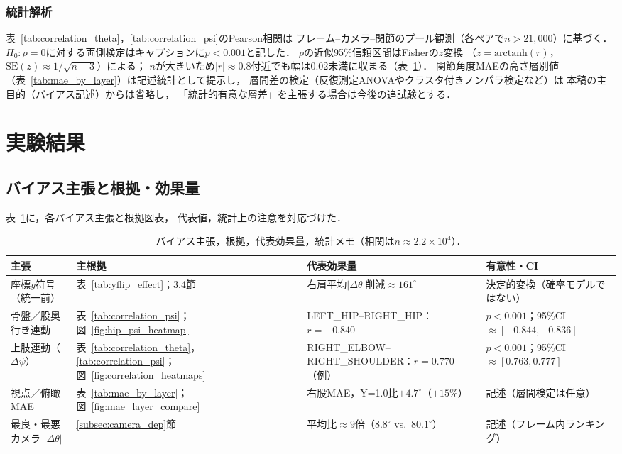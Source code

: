 \documentclass[twocolumn]{article}
\begin{document}
\subsubsection{統計解析}

表~\ref{tab:correlation_theta}，\ref{tab:correlation_psi}のPearson相関は
フレーム--カメラ--関節のプール観測（各ペアで$n>21{,}000$）に基づく．
$H_0:\rho=0$に対する両側検定はキャプションに$p<0.001$と記した．
$\rho$の近似95\%信頼区間はFisherの$z$変換
（$z=\mathrm{arctanh}(r)$，$\mathrm{SE}(z)\approx 1/\sqrt{n-3}$）による；
$n$が大きいため$|r|\approx 0.8$付近でも幅は0.02未満に収まる（表~\ref{tab:bias_claim_evidence}）．
関節角度MAEの高さ層別値（表~\ref{tab:mae_by_layer}）は記述統計として提示し，
層間差の検定（反復測定ANOVAやクラスタ付きノンパラ検定など）は
本稿の主目的（バイアス記述）からは省略し，
「統計的有意な層差」を主張する場合は今後の追試験とする．

\section{実験結果}

\subsection{バイアス主張と根拠・効果量}

表~\ref{tab:bias_claim_evidence}に，各バイアス主張と根拠図表，
代表値，統計上の注意を対応づけた．

\begin{table}[!t]
\centering
\caption{バイアス主張，根拠，代表効果量，統計メモ（相関は$n\approx 2.2\times 10^{4}$）．}
\label{tab:bias_claim_evidence}
\footnotesize
\begin{tabular}{p{} p{} p{} p{}}
\toprule
主張 & 主根拠 & 代表効果量 & 有意性・CI \\
\midrule
座標$y$符号（統一前） &
表~\ref{tab:yflip_effect}；3.4節 &
右肩平均$|\Delta\theta|$削減$\approx\!161^{\circ}$ &
決定的変換（確率モデルではない） \\
骨盤／股奥行き連動 &
表~\ref{tab:correlation_psi}；図~\ref{fig:hip_psi_heatmap} &
LEFT\_HIP--RIGHT\_HIP：$r=-0.840$ &
$p<0.001$；95\%CI $\approx[-0.844,-0.836]$ \\
上肢連動（$\Delta\psi$） &
表~\ref{tab:correlation_theta}，\ref{tab:correlation_psi}；
図~\ref{fig:correlation_heatmaps} &
RIGHT\_ELBOW--RIGHT\_SHOULDER：$r=0.770$（例） &
$p<0.001$；95\%CI $\approx[0.763,0.777]$ \\
視点／俯瞰MAE &
表~\ref{tab:mae_by_layer}；図~\ref{fig:mae_layer_compare} &
右股MAE，Y=1.0比$+4.7^{\circ}$（$+15\%$） &
記述（層間検定は任意） \\
最良・最悪カメラ $|\Delta\theta|$ &
\ref{subsec:camera_dep}節 &
平均比$\approx 9$倍（$8.8^{\circ}$ vs.\ $80.1^{\circ}$） &
記述（フレーム内ランキング） \\
\bottomrule
\end{tabular}
\end{table}
\end{document}
